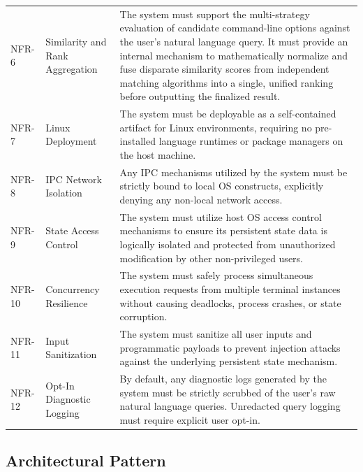 \begin{xltabular}{\textwidth}{@{} l >{\raggedright\arraybackslash}p{2.8cm} >{\raggedright\arraybackslash}X @{}}
    NFR-6 & Similarity and Rank Aggregation & The system must support the multi-strategy evaluation of candidate command-line options against the user's natural language query. It must provide an internal mechanism to mathematically normalize and fuse disparate similarity scores from independent matching algorithms into a single, unified ranking before outputting the finalized result.\\

    NFR-7 & Linux Deployment & The system must be deployable as a self-contained artifact for Linux environments, requiring no pre-installed language runtimes or package managers on the host machine. \\
    
    NFR-8 & \ac{IPC} Network Isolation & Any \ac{IPC} mechanisms utilized by the system must be strictly bound to local \ac{OS} constructs, explicitly denying any non-local network access. \\
    
    NFR-9 & State Access Control & The system must utilize host \ac{OS} access control mechanisms to ensure its persistent state data is logically isolated and protected from unauthorized modification by other non-privileged users. \\
    
    NFR-10 & Concurrency Resilience & The system must safely process simultaneous execution requests from multiple terminal instances without causing deadlocks, process crashes, or state corruption. \\
    
    NFR-11 & Input Sanitization & The system must sanitize all user inputs and programmatic payloads to prevent injection attacks against the underlying persistent state mechanism. \\
    
    NFR-12 & Opt-In Diagnostic Logging & By default, any diagnostic logs generated by the system must be strictly scrubbed of the user's raw natural language queries. Unredacted query logging must require explicit user opt-in. \\

\end{xltabular}

\FloatBarrier

\subsection{Architectural Pattern}
\label{sec:architecture_philosophy}

